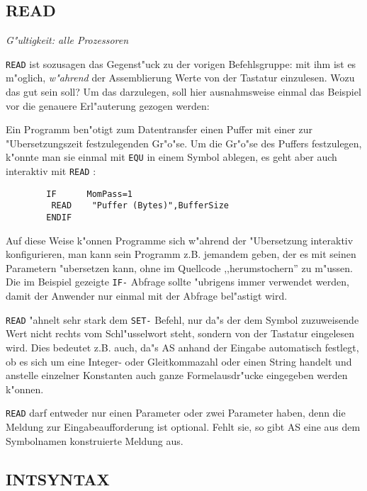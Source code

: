 \documentclass[12pt,a4paper,twoside]{report}
\makeatletter
\newcommand{\ii}[1]{{\it #1}}
\newcommand{\tty}[1]{{\tt #1}}
\newcommand{\ttindex}[1]{\index{#1@{\tt #1}}}
\makeatother
\begin{document}

\subsection{READ}
\ttindex{READ}

{\em G"ultigkeit: alle Prozessoren}

\tty{READ} ist sozusagen das Gegenst"uck zu der vorigen Befehlsgruppe: mit
ihm ist es m"oglich, \ii{w"ahrend} der Assemblierung Werte von der
Tastatur einzulesen.  Wozu das gut sein soll?  Um das darzulegen, soll
hier ausnahmsweise einmal das Beispiel vor die genauere Erl"auterung
gezogen werden:
\par
Ein Programm ben"otigt zum Datentransfer einen Puffer mit einer zur
"Ubersetzungszeit festzulegenden Gr"o"se.  Um die Gr"o"se des Puffers
festzulegen, k"onnte man sie einmal mit \tty{EQU} in einem Symbol
ablegen, es geht aber auch interaktiv mit \tty{READ} :
\begin{verbatim}
        IF      MomPass=1
         READ    "Puffer (Bytes)",BufferSize
        ENDIF
\end{verbatim}
Auf diese Weise k"onnen Programme sich w"ahrend der "Ubersetzung
interaktiv konfigurieren, man kann sein Programm z.B. jemandem geben,
der es mit seinen Parametern "ubersetzen kann, ohne im Quellcode
,,herumstochern'' zu m"ussen.  Die im Beispiel gezeigte \tty{IF-}
Abfrage sollte "ubrigens immer verwendet werden, damit der Anwender
nur einmal mit der Abfrage bel"astigt wird.
\par
\tty{READ} "ahnelt sehr stark dem \tty{SET-} Befehl, nur da"s der
dem Symbol zuzuweisende Wert nicht rechts vom Schl"usselwort steht,
sondern von der Tastatur eingelesen wird.  Dies bedeutet z.B. auch,
da"s AS anhand der Eingabe automatisch festlegt, ob es sich um eine
Integer- oder Gleitkommazahl oder einen String handelt und anstelle
einzelner Konstanten auch ganze Formelausdr"ucke eingegeben werden
k"onnen.
\par
\tty{READ} darf entweder nur einen Parameter oder zwei Parameter
haben, denn die Meldung zur Eingabeaufforderung ist optional.  Fehlt
sie, so gibt AS eine aus dem Symbolnamen konstruierte Meldung aus.


\subsection{INTSYNTAX}
\label{SectINTSYNTAX}
\ttindex{INTSYNTAX}
\end{document}
